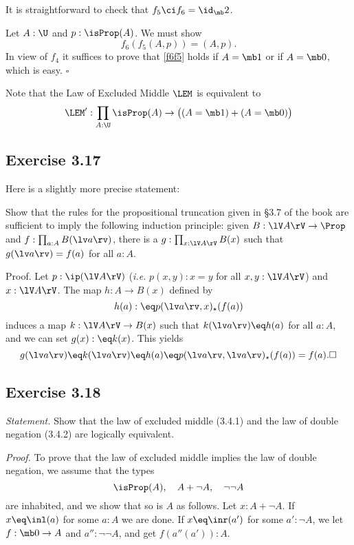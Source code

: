 \documentclass[12pt]{article}
\begin{document}
It is straightforward to check that $f_5\ci f_6=\id_\mb2$. 

Let $A:\U$ and $p:\isProp(A)$. We must show 
\begin{equation}\label{f6f5}
f_6(f_5(A,p))=(A,p).
\end{equation}
In view of $f_4$ it suffices to prove that \eqref{f6f5} holds if $A=\mb1$ or if $A=\mb0$, which is easy. $\square$ 

Note that the Law of Excluded Middle $\LEM$ is equivalent to 
$$
\LEM':\prod_{A:\U}\isProp(A)\to\big((A=\mb1)+(A=\mb0)\big)
$$ 


\subsection{Exercise 3.17}%

Here is a slightly more precise statement:

Show that the rules for the propositional truncation given in \S3.7 of the book are sufficient to imply the following induction principle: given $B:\lV A\rV\to\Prop$ and $f:\prod_{a:A}B(\lv a\rv)$, there is a $g:\prod_{x:\lV A\rV}B(x)$ such that $g(\lv a\rv)=f(a)$ for all $a:A$.

Proof. Let $p:\ip(\lV A\rV)$ (\emph{i.e.} $p(x,y):x=y$ for all $x,y:\lV A\rV$) and $x:\lV A\rV$. The map $h:A\to B(x)$ defined by 
$$
h(a):\eq p(\lv a\rv,x)_\star(f(a))
$$ 
induces a map $k:\lV A\rV\to B(x)$ such that $k(\lv a\rv)\eq h(a)$ for all $a:A$, and we can set $g(x):\eq k(x)$. This yields 
$$
g(\lv a\rv)\eq k(\lv a\rv)\eq h(a)\eq p(\lv a\rv,\lv a\rv)_\star(f(a))=f(a).\square
$$


\subsection{Exercise 3.18}

\emph{Statement.} Show that the law of excluded middle (3.4.1) and the law of double negation (3.4.2) are logically equivalent.

\nn\emph{Proof.} To prove that the law of excluded middle implies the law of double negation, we assume that the types 
$$
\isProp(A),\quad A+\neg A,\quad \neg\neg A
$$ 
are inhabited, and we show that so is $A$ as follows. Let $x:A+\neg A$. If $x\eq\inl(a)$ for some $a:A$ we are done. If $x\eq\inr(a')$ for some $a':\neg A$, we let $f:\mb0\to A$ and $a'':\neg\neg A$, and get $f(a''(a')):A$. 
\end{document}
